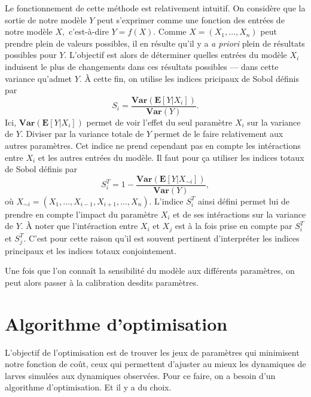 Le fonctionnement de cette méthode est relativement intuitif.
On considère que la sortie de notre modèle $Y$ peut s'exprimer comme une fonction des entrées de notre modèle $X,$ c'est-à-dire $Y = f(X)$.
Comme $X = \left( X_1, \ldots, X_n \right)$ peut prendre plein de valeurs possibles, il en résulte qu'il y a \emph{a priori} plein de résultats possibles pour $Y.$
L'objectif est alors de déterminer quelles entrées du modèle $X_i$ induisent le plus de changements dans ces résultats possibles --- dans cette variance qu'admet $Y.$
À cette fin, on utilise les indices pricipaux de Sobol définis par
\[
S_i = \frac{\textbf{Var}\!\left( \mathbf{E}\left[Y|X_i\right] \right)}{\textbf{Var}\!\left( Y \right)}.
\]
Ici, $\textbf{Var}\!\left( \mathbf{E}\left[Y|X_i\right] \right)$ permet de voir l'effet du seul paramètre $X_i$ sur la variance de $Y.$
Diviser par la variance totale de $Y$ permet de le faire relativement aux autres paramètres.
Cet indice ne prend cependant pas en compte les intéractions entre $X_i$ et les autres entrées du modèle. 
Il faut pour ça utiliser les indices totaux de Sobol définis par
\[
S^T_i = 1 - \frac{\textbf{Var}\!\left( \mathbf{E}\left[Y|X_{\sim i}\right] \right)}{\textbf{Var}\!\left( Y \right)},
\]
où $X_{\sim i} = \left(X_1, \ldots, X_{i-1}, X_{i+1}, \ldots, X_n \right)$.
L'indice $S^T_i$ ainsi défini permet lui de prendre en compte l'impact du paramètre $X_i$ et de ses intéractions sur la variance de $Y$.
À noter que l'intéraction entre $X_i$ et $X_j$ est à la fois prise en compte par $S^T_i$ et $S^T_j$.
C'est pour cette raison qu'il est souvent pertinent d'interpréter les indices principaux et les indices totaux conjointement.

Une fois que l'on connaît la sensibilité du modèle aux différents paramètres, on peut alors passer à la calibration desdits paramètres.


\section{Algorithme d'optimisation}

L'objectif de l'optimisation est de trouver les jeux de paramètres qui minimisent notre fonction de coût, ceux qui permettent d'ajuster au mieux les dynamiques de larves simulées aux dynamiques observées.
Pour ce faire, on a besoin d'un algorithme d'optimisation.
Et il y a du choix.

